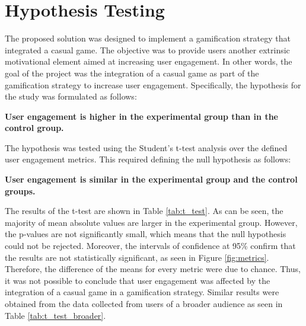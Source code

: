 \section{Hypothesis Testing}
The proposed solution was designed to implement a gamification strategy that integrated a casual game. The objective was to provide users another extrinsic motivational element aimed at increasing user engagement. In other words, the goal of the project was the integration of a casual game as part of the gamification strategy to increase user engagement. Specifically, the hypothesis for the study was formulated as follows:

\begin{displayquote}
\textbf{User engagement is higher in the experimental group than in the control group.}
\end{displayquote}

The hypothesis was tested using the Student's t-test analysis over the defined user engagement metrics. This required defining the null hypothesis as follows:

\begin{displayquote}
\textbf{User engagement is similar in the experimental group and the control groups.}
\end{displayquote}

The results of the t-test are shown in Table \ref{tab:t_test}. As can be seen, the majority of mean absolute values are larger in the experimental group. However, the p-values are not significantly small, which means that the null hypothesis could not be rejected. Moreover, the intervals of confidence at 95\% confirm that the results are not statistically significant, as seen in Figure \ref{fig:metrics}. Therefore, the difference of the means for every metric were due to chance. Thus, it was not possible to conclude that user engagement was affected by the integration of a casual game in a gamification strategy. Similar results were obtained from the data collected from users of a broader audience as seen in Table \ref{tab:t_test_broader}.


